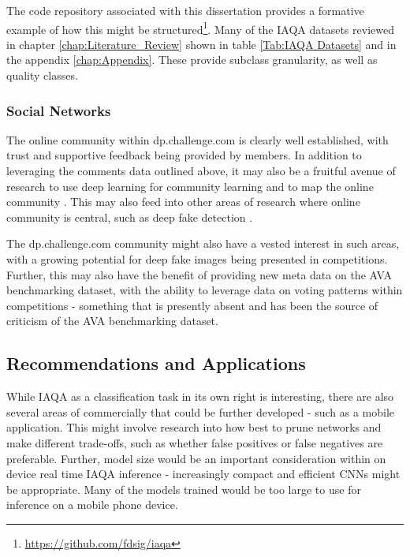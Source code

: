 The code repository associated with this dissertation provides a formative example of how this might be structured\footnote{\href{https://github.com/fdsig/iaqa}{https://github.com/fdsig/iaqa}}. Many of the IAQA datasets reviewed in chapter \ref{chap:Literature_Review} shown in table \ref{Tab:IAQA Datasets} and in the appendix \ref{chap:Appendix}. These provide subclass granularity, as well as quality classes. 


\subsubsection{Social Networks}
\label{sec:social networks}

The online community within dp.challenge.com is clearly well established, with trust and supportive feedback being provided by members. In addition to leveraging the comments data outlined above, it may also be a fruitful avenue of research to use deep learning for community learning and to map the online community \cite{Jin2017, Wu2020b}. This may also feed into other areas of research where online community is central, such as deep fake detection \cite{Ajao2019}. 

The dp.challenge.com community might also have a vested interest in such areas, with a growing potential for deep fake images being presented in competitions. Further, this may also have the benefit of providing new meta data on the AVA benchmarking dataset, with the ability to leverage data on voting patterns within competitions - something that is presently absent and has been the source of criticism of the AVA benchmarking dataset. 

\subsection{Recommendations and Applications}
\label{sec:recommended applications} 

While IAQA as a classification task in its own right is interesting, there are also several areas of commercially that could be further developed - such as a mobile application. This might involve research into how best to prune networks and make different trade-offs, such as whether false positives or false negatives are preferable. Further, model size would be an important consideration within on device real time IAQA inference - increasingly compact and efficient CNNs\cite{Feng2019} might be appropriate. Many of the models trained would be too large to use for inference on a mobile phone device.

